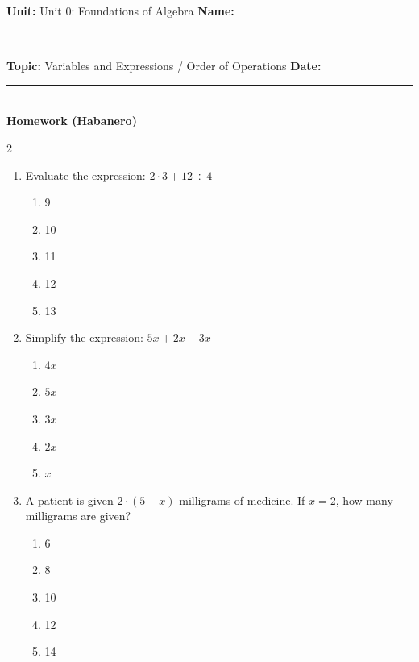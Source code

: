 \documentclass[10pt]{article}
\begin{document}
\enlargethispage{2.5cm}

\begin{tcolorbox}[colback=mainblue!5, colframe=mainblue, sharp corners, boxrule=0.5pt]
    \small \textbf{Unit:} Unit 0: Foundations of Algebra \hfill \textbf{Name:} \rule{3cm}{0.4pt} \\
    \small \textbf{Topic:} Variables and Expressions / Order of Operations \hfill \textbf{Date:} \rule{2cm}{0.4pt} \\
    \centering \textbf{\large Homework (Habanero)}
\end{tcolorbox}

\vspace{0.2cm}

\begin{multicols}{2}
\begin{enumerate}[label=\textbf{Q\arabic*.}, leftmargin=*, itemsep=6pt, parsep=0pt]

  \item \small Evaluate the expression: $2 \cdot 3 + 12 \div 4$
  \begin{enumerate}[label=(\Alph*), leftmargin=0.6cm, nosep, itemsep=2pt]
    \item 9
    \item 10
    \item 11
    \item 12
    \item 13
  \end{enumerate}

  \item \small Simplify the expression: $5x + 2x - 3x$
  \begin{enumerate}[label=(\Alph*), leftmargin=0.6cm, nosep, itemsep=2pt]
    \item $4x$
    \item $5x$
    \item $3x$
    \item $2x$
    \item $x$
  \end{enumerate}

  \item \small A patient is given $2 \cdot (5 - x)$ milligrams of medicine. If $x = 2$, how many milligrams are given?
  \begin{enumerate}[label=(\Alph*), leftmargin=0.6cm, nosep, itemsep=2pt]
    \item 6
    \item 8
    \item 10
    \item 12
    \item 14
  \end{enumerate}


\end{enumerate}
\end{multicols}
\end{document}
